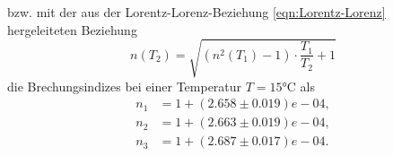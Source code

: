 bzw. mit der aus der Lorentz-Lorenz-Beziehung \ref{eqn:Lorentz-Lorenz} hergeleiteten Beziehung
\begin{equation}
  n(T_2) = \sqrt{(n^2(T_1)-1)\cdot\frac{T_1}{T_2} + 1}
\end{equation}
die Brechungsindizes bei einer Temperatur $T = 15\si{\celsius}$ als
\begin{align}
  n_1 &= 1 + (2.658 \pm 0.019)e-04, \\
  n_2 &= 1 + (2.663 \pm 0.019)e-04, \\
  n_3 &= 1 + (2.687 \pm 0.017)e-04. \\
\end{align}
